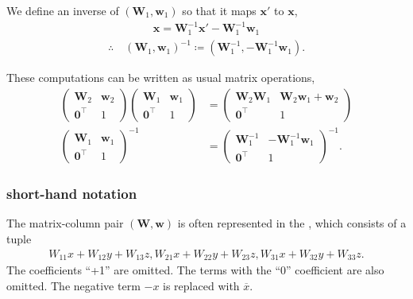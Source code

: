 We define an inverse of $(\bm{W}_{1}, \bm{w}_{1})$ so that it maps $\bm{x}'$ to $\bm{x}$,
\begin{align*}
    \bm{x} = \bm{W}_{1}^{-1}\bm{x}' - \bm{W}_{1}^{-1} \bm{w}_{1}
\end{align*}
\begin{align}
    \therefore \quad
    (\bm{W}_{1}, \bm{w}_{1})^{-1} \coloneqq (\bm{W}_{1}^{-1}, -\bm{W}_{1}^{-1} \bm{w}_{1}).
\end{align}

These computations can be written as usual matrix operations,
\begin{align}
    \begin{pmatrix} \bm{W}_{2} & \bm{w}_{2} \\ \bm{0}^{\top} & 1 \end{pmatrix}
    \begin{pmatrix} \bm{W}_{1} & \bm{w}_{1} \\ \bm{0}^{\top} & 1 \end{pmatrix}
    &=
    \begin{pmatrix} \bm{W}_{2} \bm{W}_{1} & \bm{W}_{2}\bm{w}_{1} + \bm{w}_{2} \\ \bm{0}^{\top} & 1 \end{pmatrix} \\
    \begin{pmatrix} \bm{W}_{1} & \bm{w}_{1} \\ \bm{0}^{\top} & 1 \end{pmatrix}^{-1}
    &=
    \begin{pmatrix} \bm{W}_{1}^{-1} & -\bm{W}_{1}^{-1}\bm{w}_{1} \\ \bm{0}^{\top} & 1 \end{pmatrix}^{-1}.
\end{align}

\subsubsection{short-hand notation}

The matrix-column pair $(\bm{W}, \bm{w})$ is often represented in the , which consists of a tuple
\begin{align*}
  W_{11} x + W_{12} y + W_{13} z, W_{21} x + W_{22} y + W_{23} z, W_{31} x + W_{32} y + W_{33} z.
\end{align*}
The coefficients ``+1'' are omitted.
The terms with the ``0'' coefficient are also omitted.
The negative term $-x$ is replaced with $\overline{x}$.

